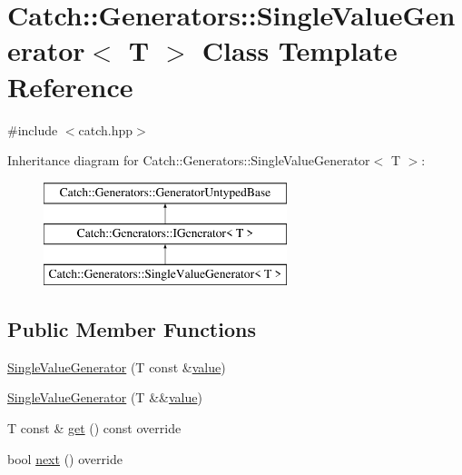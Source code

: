 \hypertarget{class_catch_1_1_generators_1_1_single_value_generator}{}\section{Catch\+::Generators\+::Single\+Value\+Generator$<$ T $>$ Class Template Reference}
\label{class_catch_1_1_generators_1_1_single_value_generator}


{\ttfamily \#include $<$catch.\+hpp$>$}

Inheritance diagram for Catch\+::Generators\+::Single\+Value\+Generator$<$ T $>$\+:\begin{figure}[H]
\begin{center}
\leavevmode
\includegraphics[height=3.000000cm]{class_catch_1_1_generators_1_1_single_value_generator}
\end{center}
\end{figure}
\subsection*{Public Member Functions}
\begin{DoxyCompactItemize}
\item 
\mbox{\hyperlink{class_catch_1_1_generators_1_1_single_value_generator_a4bed2ad14ffe04102d8135e2c82b3ace}{Single\+Value\+Generator}} (T const \&\mbox{\hyperlink{namespace_catch_1_1_generators_a3c4989dd0dca44455f55484cedaa18da}{value}})
\item 
\mbox{\hyperlink{class_catch_1_1_generators_1_1_single_value_generator_a532140dd2d1a673692271bb76a661ebe}{Single\+Value\+Generator}} (T \&\&\mbox{\hyperlink{namespace_catch_1_1_generators_a3c4989dd0dca44455f55484cedaa18da}{value}})
\item 
T const  \& \mbox{\hyperlink{class_catch_1_1_generators_1_1_single_value_generator_a5142058c52131a2471e7307972f99b50}{get}} () const override
\item 
bool \mbox{\hyperlink{class_catch_1_1_generators_1_1_single_value_generator_a10833b34e3ccbc484624185712eb8b6e}{next}} () override
\end{DoxyCompactItemize}
